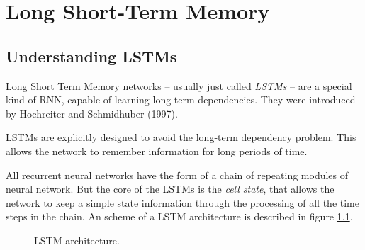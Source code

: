 
\chapter{Long Short-Term Memory} %

\label{Chapter4} %


\section{Understanding LSTMs}

Long Short Term Memory networks – usually just called \textit{LSTMs} – are a special kind of RNN, capable of learning long-term dependencies. They were introduced by Hochreiter and Schmidhuber (1997).

LSTMs are explicitly designed to avoid the long-term dependency problem. This allows the network to remember information for long periods of time.

All recurrent neural networks have the form of a chain of repeating modules of neural network. But the core of the LSTMs is the \textit{cell state}, that allows the network to keep a simple state information through the processing of all the time steps in the chain. An scheme of a LSTM architecture is described in figure \ref{fig:lstm}.

\begin{figure}
\begin{center}
\end{center}
\decoRule
\caption[LSTM architecture]{LSTM architecture.}
\label{fig:lstm}
\end{figure}

